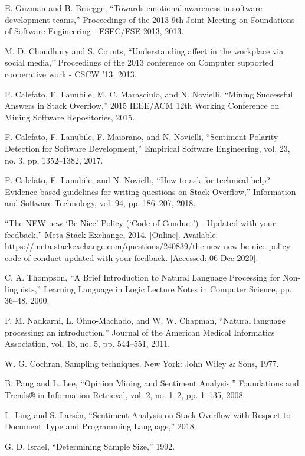 \documentclass[conference]{IEEEtran}
\begin{document}
\begin{thebibliography}{00}
 E. Guzman and B. Bruegge, “Towards emotional awareness in software development teams,” Proceedings of the 2013 9th Joint Meeting on Foundations of Software Engineering - ESEC/FSE 2013, 2013. 

 M. D. Choudhury and S. Counts, “Understanding affect in the workplace via social media,” Proceedings of the 2013 conference on Computer supported cooperative work - CSCW '13, 2013. 

 F. Calefato, F. Lanubile, M. C. Marasciulo, and N. Novielli, “Mining Successful Answers in Stack Overflow,” 2015 IEEE/ACM 12th Working Conference on Mining Software Repositories, 2015. 

 F. Calefato, F. Lanubile, F. Maiorano, and N. Novielli, “Sentiment Polarity Detection for Software Development,” Empirical Software Engineering, vol. 23, no. 3, pp. 1352–1382, 2017. 

 F. Calefato, F. Lanubile, and N. Novielli, “How to ask for technical help? Evidence-based guidelines for writing questions on Stack Overflow,” Information and Software Technology, vol. 94, pp. 186–207, 2018. 

 “The NEW new ‘Be Nice’ Policy (‘Code of Conduct’) - Updated with your feedback,” Meta Stack Exchange, 2014. [Online]. Available: https://meta.stackexchange.com/questions/240839/the-new-new-be-nice-policy-code-of-conduct-updated-with-your-feedback. [Accessed: 06-Dec-2020]. 

 C. A. Thompson, “A Brief Introduction to Natural Language Processing for Non-linguists,” Learning Language in Logic Lecture Notes in Computer Science, pp. 36–48, 2000. 

 P. M. Nadkarni, L. Ohno-Machado, and W. W. Chapman, “Natural language processing: an introduction,” Journal of the American Medical Informatics Association, vol. 18, no. 5, pp. 544–551, 2011.

 W. G. Cochran, Sampling techniques. New York: John Wiley \& Sons, 1977. 

 B. Pang and L. Lee, “Opinion Mining and Sentiment Analysis,” Foundations and Trends® in Information Retrieval, vol. 2, no. 1–2, pp. 1–135, 2008. 

 L. Ling and S. Larsén, “Sentiment Analysis on Stack Overflow with Respect to Document Type and Programming Language,” 2018. 

 G. D. Israel, “Determining Sample Size,” 1992. 


\end{thebibliography}
\end{document}
